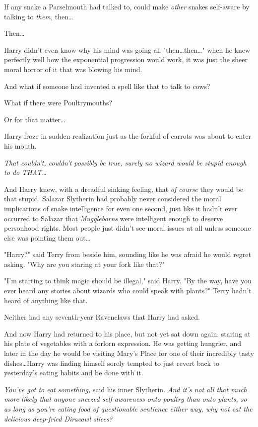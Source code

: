 If any snake a Parselmouth had talked to, could make \emph{other} snakes
self-aware by talking to \emph{them,} then…

Then…

Harry didn’t even know why his mind was going all "then…then…"
when he knew perfectly well how the exponential progression would work, it was
just the sheer moral horror of it that was blowing his mind.

And what if someone had invented a spell like that to talk to cows?

What if there were Poultrymouths?

Or for that matter…

Harry froze in sudden realization just as the forkful of carrots was about to
enter his mouth.

\emph{That couldn’t, couldn’t possibly be true, surely no wizard would be
stupid enough to do THAT…}

And Harry knew, with a dreadful sinking feeling, that \emph{of course} they
would be that stupid. Salazar Slytherin had probably never considered the moral
implications of snake intelligence for even one second, just like it hadn’t
ever occurred to Salazar that \emph{Muggleborns} were intelligent enough to
deserve personhood rights. Most people just didn’t see moral issues at all
unless someone else was pointing them out…

"Harry?" said Terry from beside him, sounding like he was afraid he would
regret asking. "Why are you staring at your fork like that?"

"I’m starting to think magic should be illegal," said Harry. "By the way, have
you ever heard any stories about wizards who could speak with plants?"
\later
Terry hadn’t heard of anything like that.

Neither had any seventh-year Ravenclaws that Harry had asked.

And now Harry had returned to his place, but not yet sat down again, staring at
his plate of vegetables with a forlorn expression. He was getting hungrier, and
later in the day he would be visiting Mary’s Place for one of their incredibly
tasty dishes…Harry was finding himself sorely tempted to just revert
back to yesterday’s eating habits and be done with it.

\emph{You’ve got to eat something,} said his inner Slytherin. \emph{And it’s
not all that much \emph{more} likely that anyone sneezed self-awareness onto
poultry than onto plants, so as long as you’re eating food of questionable
sentience either way, why not eat the delicious deep-fried Diracawl slices?}

